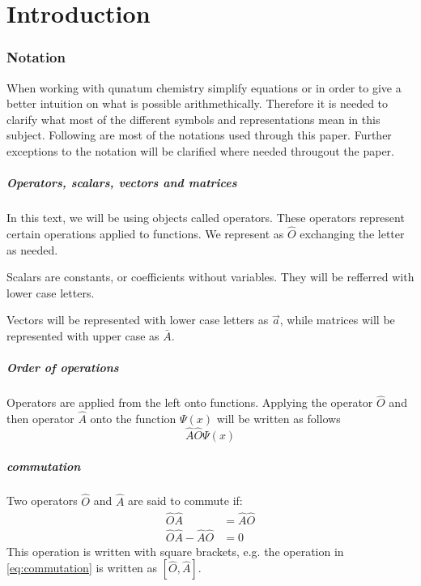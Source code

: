 \documentclass[../master_thesis.tex]{subfiles}
\begin{document}
\chapter{Introduction}
\subsection{Notation}
When working with qunatum chemistry simplify equations or in order to give a
better intuition on what is possible arithmethically. Therefore it is needed to
clarify what most of the different symbols and representations mean in this
subject. Following are most of the notations used through this paper. Further exceptions to the notation will be
clarified where needed througout the paper.
\paragraph{Operators, scalars, vectors and matrices}
In this text, we will be using objects called operators. These operators represent
certain operations applied to functions. We represent as $\hat{O}$ exchanging the letter
as needed.

Scalars are constants, or coefficients without variables. They will be refferred with
lower case letters.

Vectors will be represented with lower case letters as $\vec{a}$, while
matrices will be represented with upper case as $\bar{A}$.
\paragraph{Order of operations}
Operators are applied from the left onto functions. Applying the operator
$\hat{O}$ and then operator $\hat{A}$ onto the function $\Psi(x)$ will be written as follows
\begin{equation}
  \hat{A}\hat{O}\Psi(x)
\end{equation}

\paragraph{commutation}
Two operators $\hat{O}$ and $\hat{A}$ are said to commute if:
\begin{align}
  \hat{O}\hat{A} &= \hat{A}\hat{O} \\
  \hat{O}\hat{A} - \hat{A}\hat{O} &= 0\label{eq:commutation}
\end{align}
This operation is written with square brackets, e.g. the operation in \ref{eq:commutation} is
written as $[\hat{O},\hat{A}]$.
\end{document}
